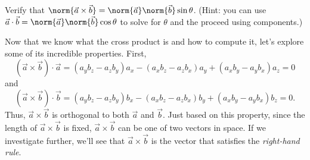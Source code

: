 \begin{exercise}
	Verify that $\norm{\vec a\times \vec b}=\norm{\vec a}\norm{\vec b}\sin\theta$. (Hint: you
	can use $\vec a\cdot \vec b=\norm{\vec a}\norm{\vec b}\cos\theta$ to solve for $\theta$
	and the proceed using components.)
\end{exercise}

Now that we know what the cross product is and how to compute it, let's explore
some of its incredible properties.  First,
\[
	(\vec a\times\vec b)\cdot \vec a=(a_yb_z - a_zb_y)a_x - (a_xb_z - a_zb_x)a_y + (a_xb_y - a_yb_x)a_z=0
\]
and
\[
	(\vec a\times\vec b)\cdot \vec b=(a_yb_z - a_zb_y)b_x - (a_xb_z - a_zb_x)b_y + (a_xb_y - a_yb_x)b_z=0.
\]
Thus, $\vec a\times\vec b$ is orthogonal to both $\vec a$ and $\vec b$.
Just based on this property, since the length of $\vec a\times \vec b$ is fixed, $\vec a\times\vec b$
can be one of two vectors in space.
If we investigate further, we'll
see that $\vec a\times\vec b$ is the vector that satisfies the \emph{right-hand rule}.


